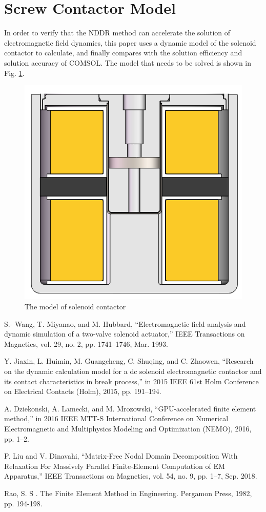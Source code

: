 \documentclass[journal,transmag]{IEEEtran}
\begin{document}
\section{Screw Contactor Model}
In order to verify that the NDDR method can accelerate the solution of electromagnetic field dynamics, this paper uses a dynamic model of the solenoid contactor to calculate, and finally compares with the solution efficiency and solution accuracy of COMSOL. The model that needs to be solved is shown in Fig.  \ref{fig:simple2}.
\begin{figure}
	\centering
	\includegraphics[width=0.4\linewidth]{simple2}
	\caption{The model of solenoid contactor}
	\label{fig:simple2}
\end{figure}


\begin{thebibliography}{1}
S.- Wang, T. Miyanao, and M. Hubbard, “Electromagnetic field analysis and dynamic simulation of a two-valve solenoid actuator,” IEEE Transactions on Magnetics, vol. 29, no. 2, pp. 1741–1746, Mar. 1993.


Y. Jiaxin, L. Huimin, M. Guangcheng, C. Shuqing, and C. Zhaowen, “Research on the dynamic calculation model for a dc solenoid electromagnetic contactor and its contact characteristics in break process,” in 2015 IEEE 61st Holm Conference on Electrical Contacts (Holm), 2015, pp. 191–194.
	
A. Dziekonski, A. Lamecki, and M. Mrozowski, “GPU-accelerated finite element method,” in 2016 IEEE MTT-S International Conference on Numerical Electromagnetic and Multiphysics Modeling and Optimization (NEMO), 2016, pp. 1–2.

P. Liu and V. Dinavahi, “Matrix-Free Nodal Domain Decomposition With Relaxation For Massively Parallel Finite-Element Computation of EM Apparatus,” IEEE Transactions on Magnetics, vol. 54, no. 9, pp. 1–7, Sep. 2018.

Rao, S. S . The Finite Element Method in Engineering. Pergamon Press, 1982, pp. 194-198.

\end{thebibliography}
\end{document}
